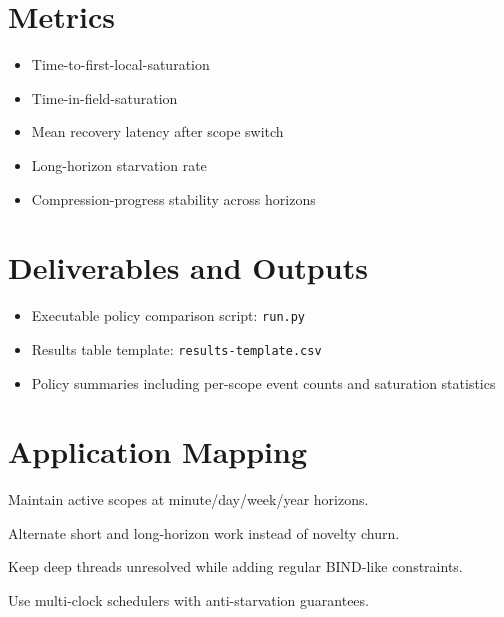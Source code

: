 \documentclass[11pt]{article}
\begin{document}
\section{Metrics}

\begin{itemize}[leftmargin=*]
  \item Time-to-first-local-saturation
  \item Time-in-field-saturation
  \item Mean recovery latency after scope switch
  \item Long-horizon starvation rate
  \item Compression-progress stability across horizons
\end{itemize}

\section{Deliverables and Outputs}

\begin{itemize}[leftmargin=*]
  \item Executable policy comparison script: \texttt{run.py}
  \item Results table template: \texttt{results-template.csv}
  \item Policy summaries including per-scope event counts and saturation statistics
\end{itemize}

\section{Application Mapping}

\begin{description}[leftmargin=2em,style=nextline]
  \item[Personal workflow] Maintain active scopes at minute/day/week/year horizons.
  \item[Education] Alternate short and long-horizon work instead of novelty churn.
  \item[Research/programming] Keep deep threads unresolved while adding regular BIND-like constraints.
  \item[AI agents] Use multi-clock schedulers with anti-starvation guarantees.
\end{description}
\end{document}
